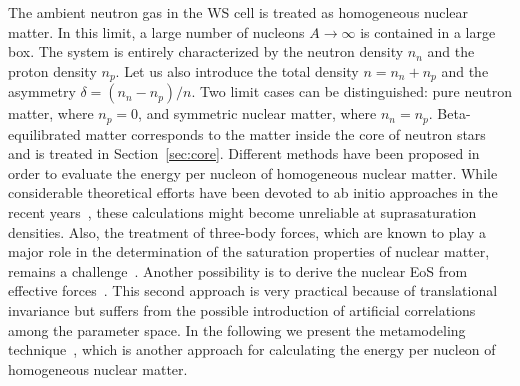 The ambient neutron gas in the WS cell is treated as homogeneous nuclear
matter.
In this limit, a large number of nucleons $A\longrightarrow \infty$ is 
contained in a large box. The system is entirely characterized by the neutron 
density $n_n$ and the proton density $n_p$. Let us also introduce the total 
density $n = n_n + n_p$ and the asymmetry $\delta = (n_n - n_p)/n$.
Two limit cases can be distinguished: pure neutron matter, where $n_p=0$,
and symmetric nuclear matter, where $n_n = n_p$. Beta-equilibrated 
matter corresponds to the matter inside the core of neutron stars and is 
treated in Section~\ref{sec:core}. Different methods have been proposed in
order to evaluate the energy per nucleon of homogeneous nuclear matter. While 
considerable theoretical efforts have been devoted to ab initio
approaches in the recent years~\cite{Gandolfi2014}, these calculations might 
become unreliable at suprasaturation densities. Also, the treatment of 
three-body forces, which are known to play a major role in the determination of 
the saturation properties of nuclear matter, remains a
challenge~\cite{Drischler2016}. Another possibility is to derive the nuclear 
EoS from effective forces~\cite{Chabanat1998}. This second approach is very 
practical because of translational invariance but suffers from the possible 
introduction of artificial correlations among the parameter space. In the 
following we present the metamodeling 
technique~\cite{Margueron2018a,Margueron2018b}, which is another approach for 
calculating the energy per nucleon of homogeneous nuclear matter.

